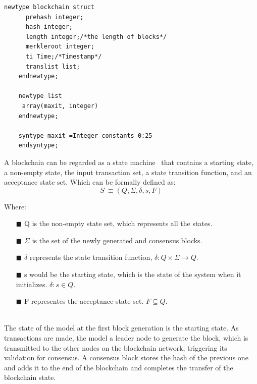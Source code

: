 \documentclass[sigconf, nonacm]{acmart}
\begin{document}
  \begin{lstlisting}[frame=single,label={lst:block-code},
    caption={Definition of a block's structure},captionpos=b]
    newtype blockchain struct
      prehash integer;
      hash integer;
      length integer;/*the length of blocks*/
      merkleroot integer;
      ti Time;/*Timestamp*/
      translist list;
    endnewtype;

    newtype list
     array(maxit, integer)
    endnewtype;
 
    syntype maxit =Integer constants 0:25
    endsyntype;
  \end{lstlisting}
  
  A blockchain can be regarded as a state machine~\cite{Duan2018} that contains a starting state, a non-empty state, the input transaction set,
  a state transition function, and an acceptance state set. Which can be formally defined as:
    \begin{displaymath}
      S~\equiv(Q,\Sigma,\delta,s,F)
    \end{displaymath}

  Where:

  \begin{enumerate}
    \item[$\blacksquare$] Q is the non-empty state set, which represents all the states.
    \item[$\blacksquare$] $\Sigma$ is the set of the newly generated and consensus blocks. 
    \item[$\blacksquare$] $\delta$ represents the state transition function,
      \begin{math}
        \delta: Q \times \Sigma \rightarrow Q
      \end{math}.
    \item[$\blacksquare$] s would be the starting state, which is the state of the system when it initializes.
      \begin{math}
        \delta: s \in Q
      \end{math}.
    \item[$\blacksquare$] F representes the acceptance state set.
      \begin{math}
        F \subseteq Q
      \end{math}.
  \end{enumerate}
  \  \\ %
  The state of the model at the first block generation is the starting state.
  As transactions are made, the model a leader node to generate the block, which is transmitted to the other nodes on the blockchain network,
  triggering its validation for consensus. 
  A consensus block stores the hash of the previous one and adds it to the end of the blockchain and completes the transfer of the blockchain state.
  
\end{document}

